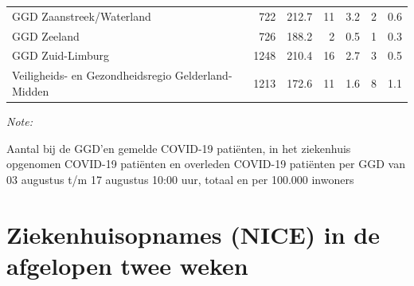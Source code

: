 \documentclass[
  english,
  man,floatsintext]{apa6}
\begin{document}
\begin{table}
\begin{threeparttable}
\begin{tabular}{lrrrrrr}
GGD Zaanstreek/Waterland & 722 & 212.7 & 11 & 3.2 & 2 & 0.6\\
GGD Zeeland & 726 & 188.2 & 2 & 0.5 & 1 & 0.3\\
GGD Zuid-Limburg & 1248 & 210.4 & 16 & 2.7 & 3 & 0.5\\
Veiligheids- en Gezondheidsregio Gelderland-Midden & 1213 & 172.6 & 11 & 1.6 & 8 & 1.1\\
\bottomrule
\end{tabular}
\begin{tablenotes}
\item \textit{Note: } 
\item Aantal bij de GGD’en gemelde COVID-19 patiënten, in het ziekenhuis opgenomen COVID-19 patiënten en overleden COVID-19 patiënten per GGD van 03 augustus t/m 17 augustus 10:00 uur, totaal en per 100.000 inwoners
\end{tablenotes}
\end{threeparttable}
\endgroup{}
\end{table}

\newpage

\hypertarget{ziekenhuisopnames-nice-in-de-afgelopen-twee-weken}{%
\section{Ziekenhuisopnames (NICE) in de afgelopen twee weken}\label{ziekenhuisopnames-nice-in-de-afgelopen-twee-weken}}
\end{document}
